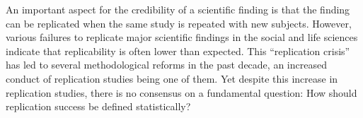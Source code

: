 An important aspect for the credibility of a scientific finding is that the
finding can be replicated when the same study is repeated with new subjects.
However, various failures to replicate major scientific findings in the social
and life sciences indicate that replicability is often lower than expected. This
``replication crisis'' has led to several methodological reforms in the past
decade, an increased conduct of replication studies being one of them. Yet
despite this increase in replication studies, there is no consensus on a
fundamental question: How should replication success be defined statistically?

